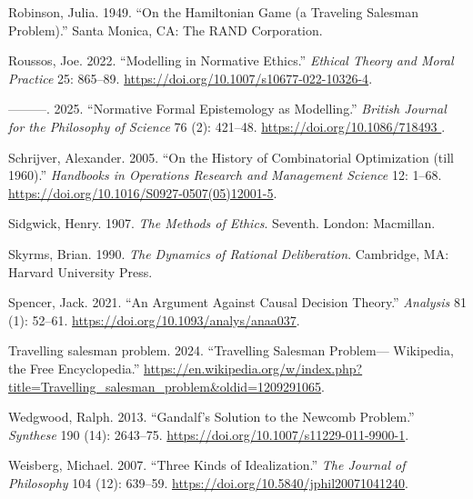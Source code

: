 \documentclass[
  12pt,
  letterpaper,
  DIV=11,
  numbers=noendperiod,
  twoside]{scrartcl}
\newlength{\cslhangindent}
\newenvironment{CSLReferences}[2] %
 {\begin{list}{}{%
  \setlength{\itemindent}{0pt}
  \setlength{\leftmargin}{0pt}
  \setlength{\parsep}{0pt}
  \ifodd #1
   \setlength{\leftmargin}{\cslhangindent}
   \setlength{\itemindent}{-1\cslhangindent}
  \fi
  \setlength{\itemsep}{#2\baselineskip}}}
 {\end{list}}
\begin{document}
\begin{CSLReferences}{1}{0}
Robinson, Julia. 1949. {``On the Hamiltonian Game (a Traveling Salesman
Problem).''} Santa Monica, CA: The RAND Corporation.

Roussos, Joe. 2022. {``Modelling in Normative Ethics.''} \emph{Ethical
Theory and Moral Practice} 25: 865--89.
\url{https://doi.org/10.1007/s10677-022-10326-4}.

---------. 2025. {``Normative Formal Epistemology as Modelling.''}
\emph{British Journal for the Philosophy of Science} 76 (2): 421--48.
\href{https://doi.org/10.1086/718493\%20}{https://doi.org/10.1086/718493
}.

Schrijver, Alexander. 2005. {``On the History of Combinatorial
Optimization (till 1960).''} \emph{Handbooks in Operations Research and
Management Science} 12: 1--68.
\url{https://doi.org/10.1016/S0927-0507(05)12001-5}.

Sidgwick, Henry. 1907. \emph{The Methods of Ethics}. Seventh. London:
Macmillan.

Skyrms, Brian. 1990. \emph{The Dynamics of Rational Deliberation}.
Cambridge, MA: Harvard University Press.

Spencer, Jack. 2021. {``An Argument Against Causal Decision Theory.''}
\emph{Analysis} 81 (1): 52--61.
\url{https://doi.org/10.1093/analys/anaa037}.

Travelling salesman problem. 2024. {``Travelling Salesman Problem---
{W}ikipedia{,} the Free Encyclopedia.''}
\url{https://en.wikipedia.org/w/index.php?title=Travelling_salesman_problem&oldid=1209291065}.

Wedgwood, Ralph. 2013. {``Gandalf's Solution to the Newcomb Problem.''}
\emph{Synthese} 190 (14): 2643--75.
\url{https://doi.org/10.1007/s11229-011-9900-1}.

Weisberg, Michael. 2007. {``Three Kinds of Idealization.''} \emph{The
Journal of Philosophy} 104 (12): 639--59.
\url{https://doi.org/10.5840/jphil20071041240}.

\end{CSLReferences}
\end{document}
